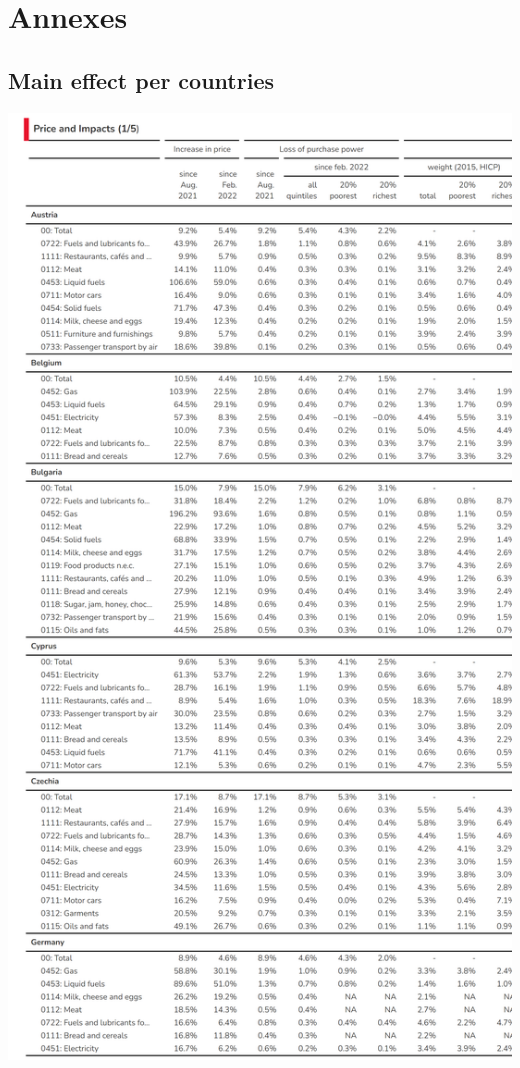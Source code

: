 \documentclass[
  9pt,
  a4paper,
  numbers=noendperiod,
  DIV=12]{scrartcl}
\begin{document}
\newpage

\hypertarget{annexes}{%
\section{Annexes}\label{annexes}}

\hypertarget{main-effect-per-countries}{%
\subsection{Main effect per countries}\label{main-effect-per-countries}}

\includegraphics{../svg/annex_1.png}
\end{document}
